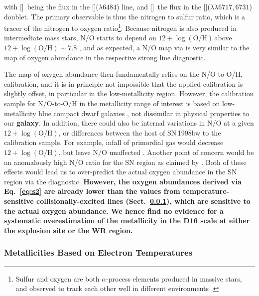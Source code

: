 \documentclass[traditabstract, referee]{aa}
\newcommand{\oh}{12+\log(\mathrm{O/H})}
\newcommand{\sii}{[\ion{S}{ii}]}
\newcommand{\nii}{[\ion{N}{ii}]}
\begin{document}
with \nii\, being the flux in the \nii($\lambda6484$) line, and \sii\, the flux in the \sii($\lambda\lambda6717,6731$) doublet. The primary observable is thus the nitrogen to sulfur ratio, which is a tracer of the nitrogen to oxygen ratio\footnote{Sulfur and oxygen are both $\alpha$-process elements produced in massive stars, and observed to track each other well in different environments \citep[see e.g. Fig. 6 in][]{2006A&A...448..955I}.}. Because nitrogen is also produced in intermediate mass stars, N/O starts to depend on $\oh$\,above $\oh\sim 7.8$ \citep[e.g.][]{1999ApJ...511..639I, 2013A&A...549A..25P, 2016A&A...595A..62P}, and as expected, a N/O map via \citet{2010ApJ...715L.128A} is very similar to the map of oxygen abundance in the respective strong line diagnostic.

The map of oxygen abundance then fundamentally relies on the N/O-to-O/H, calibration, and it is in principle not impossible that the applied calibration is slightly offset, in particular in the low-metallicity region. However, the calibration sample for N/O-to-O/H in the metallicity range of interest is based on low-metallicity blue compact dwarf galaxies \citep{1999ApJ...511..639I}, not dissimilar in physical properties to our \textbf{galaxy}. In addition, there could also be internal variations in N/O at a given $\oh$, or differences between the host of SN\,1998bw to the calibration sample. For example, infall of primordial gas \citep[e.g.,][]{2015A&A...582A..78M} would decrease $\oh$, but leave N/O unaffected \citep{2016ApJ...823L..24K}. Another point of concern would be an anomalously high N/O ratio for the SN region as claimed by \citet{2006A&A...454..103H}. Both of these effects would lead us to over-predict the actual oxygen abundance in the SN region via the \citet{2016Ap&SS.361...61D} diagnostic. \textbf{However, the oxygen abundances derived via Eq.~\ref{eq:s2} are already lower than the values from temperature-sensitive collisionally-excited lines (Sect.~\ref{teoh}), which are sensitive to the actual oxygen abundance. We hence find no evidence for a systematic overestimation of the metallicity in the D16 scale at either the explosion site or the WR region.}


\subsubsection{Metallicities Based on Electron Temperatures}
\label{teoh}
\end{document}

